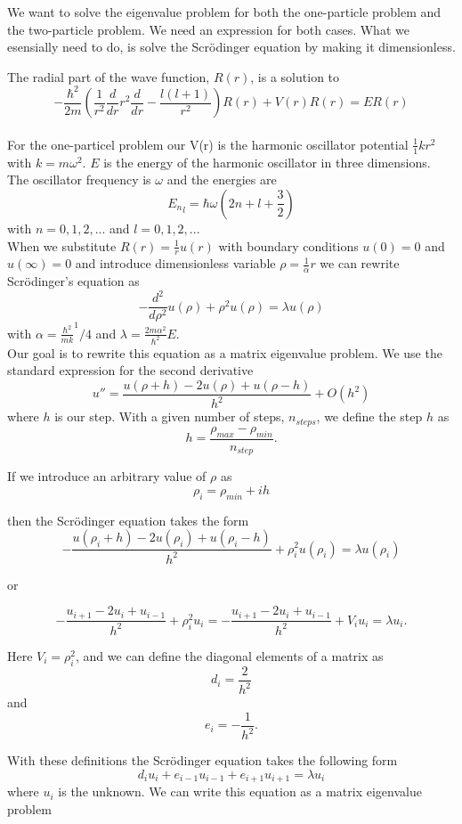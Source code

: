 \documentclass[a4paper,12pt, english]{article}
\begin{document}
We want to solve the eigenvalue problem for both the one-particle problem and the two-particle problem. We need an expression for both cases. 
What we esensially need to do, is solve the Scr\"odinger equation by making it dimensionless. 

The radial part of the wave function, $R(r)$, is a solution to 
\\
$$ -\frac{\hbar^2}{2m}(\frac{1}{r^2}\frac{d}{dr}r^2\frac{d}{dr} - \frac{l(l+1)}{r^2})R(r) + V(r)R(r) = ER(r)  $$
\\

For the one-particel problem our V(r) is the harmonic oscillator potential $\frac{1}{1}kr^2$ with $k=m\omega^2$. $E$ is the energy of the harmonic oscillator in three dimensions. The oscillator frequency is $\omega$ and the energies are
$$ {E_n}_l = \hbar\omega(2n + l + \frac{3}{2}) $$
with $n = 0,1,2,...$ and $l = 0,1,2,...$  \\
When we substitute $R(r) = \frac{1}{r}u(r)$ with boundary conditions $u(0) = 0$ and $u(\infty) = 0$ and introduce dimensionless variable $\rho = \frac{1}{\alpha}r$ we can rewrite Scr\"odinger's equation as 
$$ - \frac{d^2}{d\rho^2}u(\rho) + \rho^2u(\rho) = \lambda u(\rho) $$
with $\alpha = \frac{\hbar^2}{mk}^1/4$ and $\lambda = \frac{2m\alpha^2}{\hbar^2}E$. \\

Our goal is to rewrite this equation as a matrix eigenvalue problem. We use the standard expression for the second derivative $$ u'' = \frac{u(\rho + h) -2u(\rho) + u(\rho -h)}{h^2} + O(h^2) $$
where $h$ is our step.
With a given number of steps, $n_{steps}$, we define the step $h$ as $$h = \frac{\rho_{max}-\rho_{min}}{n_{step}}. $$

If we introduce an arbitrary value of $\rho$ as 
\\
$$\rho_{i} = \rho_{min} + ih$$

then the Scr\"odinger equation takes the form 
$$-\frac{u(\rho_i+h) -2u(\rho_i) +u(\rho_i-h)}{h^2}+\rho_i^2u(\rho_i)  = \lambda u(\rho_i)$$

or 

$$-\frac{u_{i+1} -2u_i +u_{i-1}}{h^2}+\rho_i^2u_i=-\frac{u_{i+1} -2u_i +u_{i-1} }{h^2}+V_iu_i  = \lambda u_i.$$

Here $V_{i} = \rho_i^2$, and we can define the diagonal elements of a matrix as 
$$d_i = \frac{2}{h^2}$$ and
$$e_i = -\frac{1}{h^2}.$$


With these definitions the Scr\"odinger equation takes the following form $$ d_iu_i + e_{i-1}u_{i-1} + e_{i+1}u_{i+1} = \lambda u_i $$
where $u_i$ is the unknown. We can write this equation as a matrix eigenvalue problem \\
\end{document}
